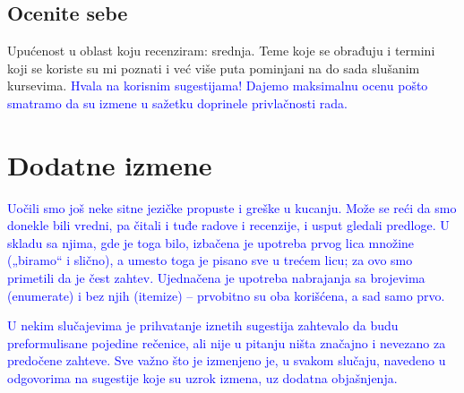 \documentclass[a4paper]{report}
\newcommand{\odgovor}[1]{\textcolor{blue}{#1}}
\begin{document}
\section{Ocenite sebe}
Upućenost u oblast koju recenziram: srednja. Teme koje se obrađuju i termini koji se koriste su mi poznati i već više puta pominjani na do sada slušanim kursevima. \odgovor{Hvala na korisnim sugestijama! Dajemo maksimalnu ocenu pošto smatramo da su izmene u sažetku doprinele privlačnosti rada.}


\chapter{Dodatne izmene}
\odgovor{Uočili smo još neke sitne jezičke propuste i greške u kucanju. Može se reći da smo donekle bili vredni, pa čitali i tuđe radove i recenzije, i usput gledali predloge. U skladu sa njima, gde je toga bilo, izbačena je upotreba prvog lica množine („biramo“ i slično), a umesto toga je pisano sve u trećem licu; za ovo smo primetili da je čest zahtev. Ujednačena je upotreba nabrajanja sa brojevima (enumerate) i bez njih (itemize) -- prvobitno su oba korišćena, a sad samo prvo.}

\odgovor{U nekim slučajevima je prihvatanje iznetih sugestija zahtevalo da budu preformulisane pojedine rečenice, ali nije u pitanju ništa značajno i nevezano za predočene zahteve. Sve važno što je izmenjeno je, u svakom slučaju, navedeno u odgovorima na sugestije koje su uzrok izmena, uz dodatna objašnjenja.}
\end{document}
